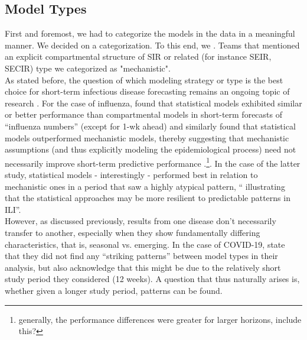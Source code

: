 \subsection{Model Types} \label{sub:model_types_analysis}
First and foremost, we had to categorize the models in the data in a meaningful manner. We decided on a categorization. To this end, we . Teams that mentioned an explicit compartmental structure of SIR or related (for instance SEIR, SECIR) type we categorized as "mechanistic".\\
As stated before, the question of which modeling strategy or type is the best choice for short-term infectious disease forecasting remains an ongoing topic of research \cite{funk_short-term_nodate}. For the case of influenza, \cite{reich_collaborative_2019} found that statistical models exhibited similar or better performance than compartmental models in short-term forecasts of ``influenza numbers'' (except for 1-wk ahead) and \cite{the_influenza_forecasting_working_group_collaborative_2019} similarly found that statistical models outperformed mechanistic models, thereby suggesting that mechanistic assumptions (and thus explicitly modeling the epidemiological process) need not necessarily improve short-term predictive performance \cite{funk_short-term_nodate}.\footnote{generally, the performance differences were greater for larger horizons, include this?}. In the case of the latter study, statistical models - interestingly - performed best in relation to mechanistic ones in a period that saw a highly atypical pattern, `` illustrating that the statistical approaches may be more resilient to predictable patterns in ILI''.\\
However, as discussed previously, results from one disease don't necessarily transfer to another, especially when they show fundamentally differing characteristics, that is, seasonal vs. emerging. In the case of COVID-19, \citep{bracher_evaluating_2021} state that they did not find any ``striking patterns'' between model types in their analysis, but also acknowledge that this might be due to the relatively short study period they considered (12 weeks). A question that thus naturally arises is, whether given a longer study period, patterns can be found.\\
